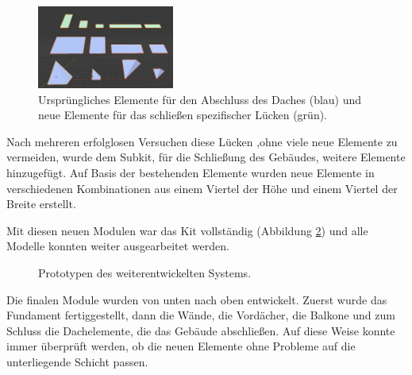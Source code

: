 \par
\begin{figure}
  \centering 
   \vspace{-12.5pt}
    \includegraphics[width=0.4\textwidth]{bilder/DacheElemente}
      \caption{Ursprüngliches Elemente für den Abschluss des Daches (blau) und neue Elemente für das schließen spezifischer Lücken (grün).}\label{DacheElemente}
          \vspace{-14pt}
\end{figure}
Nach mehreren erfolglosen Versuchen diese Lücken ,ohne viele neue Elemente zu vermeiden, wurde dem Subkit, für die Schließung des Gebäudes, weitere Elemente hinzugefügt. Auf Basis der bestehenden Elemente wurden neue Elemente in verschiedenen Kombinationen aus einem Viertel der Höhe und einem Viertel der Breite erstellt.
\par
Mit diesen neuen Modulen war das Kit vollständig (Abbildung \ref{finalmodul}) und alle Modelle konnten weiter ausgearbeitet werden.
\begin{figure}[H]
\centering
  \caption{Prototypen des weiterentwickelten Systems.}
	\label{finalmodul}
\end{figure}
\vspace{-10.5pt}
Die finalen Module wurden von unten nach oben entwickelt. Zuerst wurde das Fundament fertiggestellt, dann die Wände, die Vordächer, die Balkone und zum Schluss die Dachelemente, die das Gebäude abschließen. Auf diese Weise konnte immer überprüft werden, ob die neuen Elemente ohne Probleme auf die unterliegende Schicht passen.
